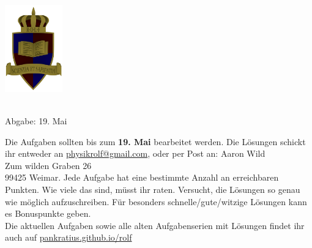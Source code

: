 \documentclass[a4paper]{article}
\begin{document}
	\vspace*{-2cm}
	\parbox{4cm}{\includegraphics[width=2.5cm]{../images/ROLF4.png}}
	\parbox{10.6cm}{ \\ Abgabe: 19. Mai \\ \vspace*{-.5cm} }
	
	

\thispagestyle{empty}
\begin{framed}
	\noindent
	\scriptsize
	Die Aufgaben sollten bis zum \textbf{19. Mai} bearbeitet werden. Die Lösungen schickt ihr entweder an \href{mailto:physikrolf@gmail.com}{physikrolf@gmail.com}, oder per Post an: 
	Aaron Wild\\Zum wilden Graben 26\\99425 Weimar.
	Jede Aufgabe hat eine bestimmte Anzahl an erreichbaren Punkten. Wie viele das sind, müsst ihr raten. Versucht, die Lösungen so genau wie möglich aufzuschreiben. Für besonders schnelle/gute/witzige Lösungen kann es Bonuspunkte geben.\\ Die aktuellen Aufgaben sowie alle alten Aufgabenserien mit Lösungen findet ihr auch auf \url{pankratius.github.io/rolf}

\end{framed}

\noindent




\end{document}
